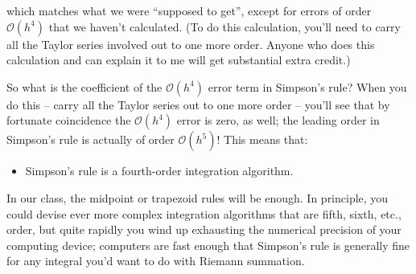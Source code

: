 \documentclass[12ampt]{article}
\begin{document}
 which matches what we were ``supposed to get'', except for errors of order $\mathcal O(h^4)$ that we haven't calculated. (To do this calculation, you'll need to carry all the Taylor series involved out to one more order.
 Anyone who does this calculation and can explain it to me will get substantial extra credit.)

 So what is the coefficient of the $\mathcal O(h^4)$ error term in Simpson's rule? When you do this -- carry all the Taylor series out to one more order -- you'll see that by fortunate coincidence the $\mathcal O(h^4)$
 error is zero, as well; the leading order in Simpson's rule is actually of order $\mathcal O(h^5)$! This means that:

 \begin{itemize}
   \item{Simpson's rule is a fourth-order integration algorithm.}
 \end{itemize}

 In our class, the midpoint or trapezoid rules will be enough. In principle, you could devise ever more complex integration algorithms that are fifth, sixth, etc., order, but quite rapidly you wind up exhausting the numerical precision
 of your computing device; computers are fast enough that Simpson's rule is generally fine for any integral you'd want to do with Riemann summation.

 
\end{document}
